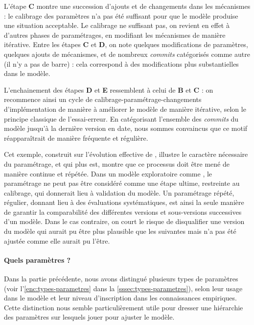 L'étape \textbf{C} montre une succession d'ajouts et de changements dans les mécanismes : le calibrage des paramètres n'a pas été suffisant pour que le modèle produise une situation acceptable.
Le calibrage ne suffisant pas, on revient en effet à d'autres phases de paramétrages, en modifiant les mécanismes de manière itérative.
Entre les étapes \textbf{C} et \textbf{D}, on note quelques modifications de paramètres, quelques ajouts de mécanismes, et de nombreux \textit{commits} catégorisés comme \og autre\fg{} (il n'y a pas de barre) : cela correspond à des modifications plus substantielles dans le modèle.

L'enchainement des étapes \textbf{D} et \textbf{E} ressemblent à celui de \textbf{B} et \textbf{C} : on recommence ainsi un cycle de calibrage-paramétrage-changements d'implémentation de manière à améliorer le modèle de manière itérative, selon le principe classique de l'essai-erreur.
En catégorisant l'ensemble des \textit{commits} du modèle jusqu'à la dernière version en date, nous sommes convaincus que ce motif réapparaîtrait de manière fréquente et régulière.

Cet exemple, construit sur l'évolution effective de \simfeodal{}, illustre le caractère nécessaire du paramétrage, et qui plus est, montre que ce processus doit être mené de manière continue et répétée.
Dans un modèle exploratoire comme \simfeodal{}, le paramétrage ne peut pas être considéré comme une étape ultime, restreinte au calibrage, qui donnerait lieu à validation du modèle.
Un paramétrage répété, régulier, donnant lieu à des évaluations systématiques, est ainsi la seule manière de garantir la comparabilité des différentes versions et sous-versions successives d'un modèle.
Dans le cas contraire, on court le risque de disqualifier une version du modèle qui aurait pu être plus plausible que les suivantes mais n'a pas été ajustée comme elle aurait pu l'être.

\paragraph{Quels paramètres ?} \label{sssec:quels-parametres}

Dans la partie précédente, nous avons distingué plusieurs types de paramètres (voir l'\cref{enc:types-parametres} dans la \cref{sssec:types-parametres}), selon leur usage dans le modèle et leur niveau d'inscription dans les connaissances empiriques.
Cette distinction nous semble particulièrement utile pour dresser une hiérarchie des paramètres sur lesquels jouer pour ajuster le modèle.

